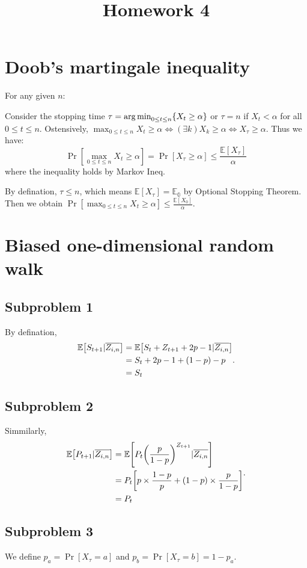 \documentclass{article}
\begin{document}
\title{\vspace{-1cm}Homework 4}
\maketitle
\section{Doob's martingale inequality}
For any given $n$:

Consider the stopping time $\tau=\mathop{\arg\min}_{0\le t\le n}\{X_t\ge \alpha\}$ or $\tau=n$ if  $X_t<\alpha$ for all  $0\le t\le n$. Ostensively, $\max_{0\le t\le n}X_t\ge \alpha\iff (\exists k) X_k\ge \alpha \iff X_\tau\ge \alpha$. Thus we have:
\[
	\Pr[\max_{0\le t\le n}X_t\ge \alpha]
	=
	\Pr[X_\tau\ge \alpha]
	\le 
	\frac{\mathbb{E}[X_\tau]}{\alpha}
\] where the inequality holds by Markov Ineq.

By defination, $\tau\le n$, which means $\mathbb{E}[X_\tau]=\mathbb{E_0}$ by Optional Stopping Theorem.
Then we obtain $\Pr[\max_{0\le t\le n}X_t\ge \alpha]\le \frac{\mathbb{E}[X_0]}{\alpha}$.

\section{Biased one-dimensional random walk}
\subsection*{Subproblem 1}
By defination,
\[
	\begin{aligned}
		\mathbb{E}\qty[S_{t+1}|\overline{Z_{i,n}}]
		&=
		\mathbb{E}\qty[S_t+Z_{t+1}+2p-1|\overline{Z_{i,n}}]
		\\&=
		S_t+2p-1+(1-p)-p
		\\&=
		S_t	
	\end{aligned}
.\] 
\subsection*{Subproblem 2}
Simmilarly,
\[
    \begin{aligned}
    	\mathbb{E}\qty[P_{t+1}|\overline{Z_{i,n}}]
		&=
		\mathbb{E}\qty[P_t\qty(\frac{p}{1-p})^{Z_{t+1}}|\overline{Z_{i,n}}]
		\\&=
		P_t\qty[p\times\frac{1-p}{p}+(1-p)\times\frac{p}{1-p}]
		\\&=
		P_t
    \end{aligned}
.\] 

\subsection*{Subproblem 3}
We define $p_a=\Pr[X_\tau=a]$ and $p_b=\Pr[X_\tau=b]=1-p_a$.
\end{document}
